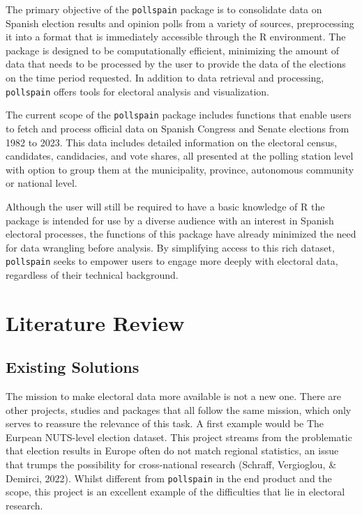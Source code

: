 \documentclass[
  letterpaper,
  DIV=11,
  numbers=noendperiod]{scrreprt}
\begin{document}
The primary objective of the \texttt{pollspain} package is to
consolidate data on Spanish election results and opinion polls from a
variety of sources, preprocessing it into a format that is immediately
accessible through the R environment. The package is designed to be
computationally efficient, minimizing the amount of data that needs to
be processed by the user to provide the data of the elections on the
time period requested. In addition to data retrieval and processing,
\texttt{pollspain} offers tools for electoral analysis and
visualization.

The current scope of the \texttt{pollspain} package includes functions
that enable users to fetch and process official data on Spanish Congress
and Senate elections from 1982 to 2023. This data includes detailed
information on the electoral census, candidates, candidacies, and vote
shares, all presented at the polling station level with option to group
them at the municipality, province, autonomous community or national
level.

Although the user will still be required to have a basic knowledge of R
the package is intended for use by a diverse audience with an interest
in Spanish electoral processes, the functions of this package have
already minimized the need for data wrangling before analysis. By
simplifying access to this rich dataset, \texttt{pollspain} seeks to
empower users to engage more deeply with electoral data, regardless of
their technical background.


\hypertarget{literature-review}{%
\chapter{Literature Review}\label{literature-review}}

\hypertarget{existing-solutions}{%
\section{Existing Solutions}\label{existing-solutions}}

The mission to make electoral data more available is not a new one.
There are other projects, studies and packages that all follow the same
mission, which only serves to reassure the relevance of this task. A
first example would be The Eurpean NUTS-level election dataset. This
project streams from the problematic that election results in Europe
often do not match regional statistics, an issue that trumps the
possibility for cross-national research (Schraff, Vergioglou, \&
Demirci, 2022). Whilst different from \texttt{pollspain} in the end
product and the scope, this project is an excellent example of the
difficulties that lie in electoral research.
\end{document}
